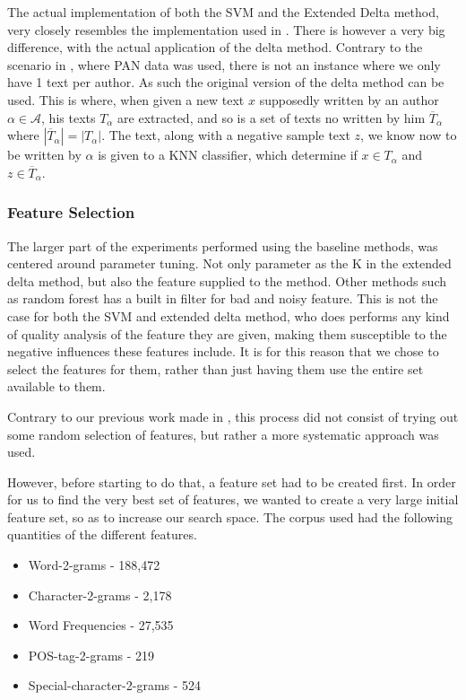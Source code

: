 The actual implementation of both the \gls{SVM} and the Extended Delta method,
very closely resembles the implementation used in \cite{US}. There is however a
very big difference, with the actual application of the delta method. Contrary
to the scenario in \cite{US}, where PAN data was used, there is not an instance
where we only have 1 text per author. As such the original version of the
delta method can be used.\cite{evert2015towards} This is where, when given a
new text $x$ supposedly written by an author $\alpha \in \mathcal{A}$, his
texts $T_\alpha$ are extracted, and so is a set of texts no written by him
$\overline{T}_\alpha$ where $|\overline{T}_\alpha| = |T_\alpha|$. The text,
along with a negative sample text $z$, we know now to be written by $\alpha$ is
given to a \gls{KNN} classifier, which determine if $x \in T_\alpha$ and $z \in
\overline{T}_\alpha$.

\subsubsection{Feature Selection}

The larger part of the experiments performed using the baseline methods, was
centered around parameter tuning. Not only parameter as the K in the extended
delta method, but also the feature supplied to the method. Other methods such
as random forest has a built in filter for bad and noisy feature. This is not
the case for both the \gls{SVM} and extended delta method, who does performs any
kind of quality analysis of the feature they are given, making them susceptible
to the negative influences these features include. It is for this reason that
we chose to select the features for them, rather than just having them use the
entire set available to them.

Contrary to our previous work made in \cite{US}, this process did not
consist of trying out some random selection of features, but rather
a more systematic approach was used.

However, before starting to do that, a feature set had to be created
first. In order for us to find the very best set of features, we wanted
to create a very large initial feature set, so as to increase our search space.
The corpus used had the following quantities of the different features.

\begin{itemize}
    \item Word-2-grams - 188,472
    \item Character-2-grams - 2,178
    \item Word Frequencies - 27,535
    \item \gls{POS}-tag-2-grams - 219
    \item Special-character-2-grams - 524
\end{itemize}

